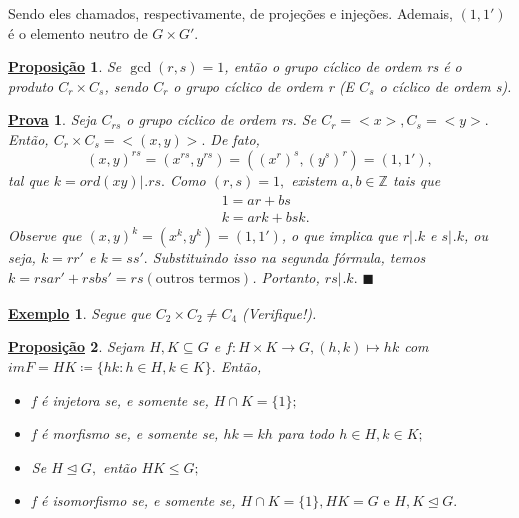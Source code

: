 \documentclass{article}
\newtheorem*{prop*}{\underline{Proposi\c c\~ao}}
\newtheorem{example*}{\underline{Exemplo}}
\newtheorem*{proof*}{\underline{Prova}}
\renewcommand\qedsymbol{$\blacksquare$}
\begin{document}
 Sendo eles chamados, respectivamente, de proje\c c\~oes e inje\c c\~oes. Ademais, $(1, 1')$ \'e o elemento neutro de $G\times{G'}.$
 \begin{prop*}
   Se $\gcd{(r, s)} = 1$, ent\~ao o grupo c\'iclico de ordem rs \'e o produto $C_{r}\times{C_{s}}$, sendo $C_{r}$ o grupo
 c\'iclico de ordem r (E $C_{s}$ o c\'iclico de ordem s).
 \end{prop*}
\begin{proof*}
  Seja $C_{rs}$ o grupo c\'iclico de ordem rs. Se $C_{r}=<x>, C_{s} = <y>.$ Ent\~ao, $C_{r}\times{C_{s}} = <(x, y)>.$ De fato, 
    $$
    (x, y)^{rs} = (x^{rs}, y^{rs}) = ((x^{r})^{s}, (y^{s})^{r}) = (1, 1'),
    $$
  tal que $k = ord(xy)\biggl|_{}^{}\biggr.rs.$ Como $(r, s) = 1,$ existem $a, b\in \mathbb{Z}$ tais que 
   \begin{align*}
     &1 = ar + bs\\
     &k = ark + bsk.
   \end{align*}
  Observe que $(x, y)^{k} = (x^{k}, y^{k}) = (1, 1')$, o que implica que $r \biggl|_{}^{}\biggr.k$ e $s \biggl|_{}^{}\biggr.k$, ou seja,
  $k = rr'$ e $k = ss'.$ Substituindo isso na segunda f\'ormula, temos $k = rsar' + rsbs' = rs(\text{outros termos})$. Portanto,
  $rs \biggl|_{}^{}\biggr.k.$ \qedsymbol
\end{proof*}
\begin{example*}
  Segue que $C_{2}\times C_{2}\neq C_{4}$ (Verifique!).
\end{example*}
\begin{prop*}
  Sejam $H, K \subseteq{G}$ e $f:H\times{K}\rightarrow G, (h,k)\mapsto hk$ com $im F = HK\coloneqq\{hk: h\in H, k\in K\}.$ Ent\~ao,
 \begin{itemize}
   \item[a)] f \'e injetora se, e somente se, $H\cap{K} = \{1\};$
   \item[b)] f \'e morfismo se, e somente se, $hk=kh$ para todo $h\in H, k\in K;$
   \item[c)] Se $H\trianglelefteq{G},$ ent\~ao $HK\leq{G};$
   \item[d)] f \'e isomorfismo se, e somente se, $H\cap{K}=\{1\}, HK = G\text{ e }H, K\trianglelefteq{G}.$
\end{itemize}
\end{prop*}
\end{document}

